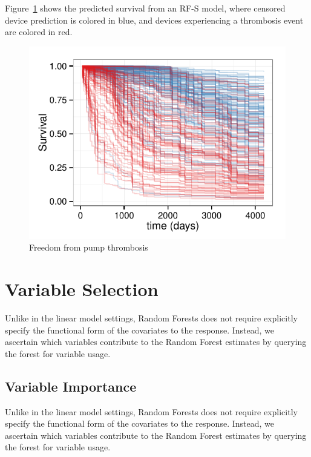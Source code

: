 \documentclass[nojss]{jss}
\begin{document}
Figure~\ref{fig:rfsrc-plot} shows the predicted survival from an RF-S model, where censored device prediction is colored in blue, and devices experiencing a thrombosis event are colored in red.  
\begin{knitrout}\footnotesize
{}\color{fgcolor}\begin{figure}[!htpb]

{\centering \includegraphics[width=\maxwidth]{figure/rfs-rfsrc-plot-1} 

}

\caption[Freedom from pump thrombosis]{Freedom from pump thrombosis\label{fig:rfsrc-plot}}
\end{figure}


\end{knitrout}

\section{Variable Selection}
Unlike in the linear model settings, Random Forests does not require explicitly specify the functional form of the covariates to the response. Instead, we ascertain which variables contribute to the Random Forest estimates by querying the forest for variable usage. 

\subsection{Variable Importance}\label{S:vimp}
Unlike in the linear model settings, Random Forests does not require explicitly specify the functional form of the covariates to the response. Instead, we ascertain which variables contribute to the Random Forest estimates by querying the forest for variable usage. 
\end{document}

